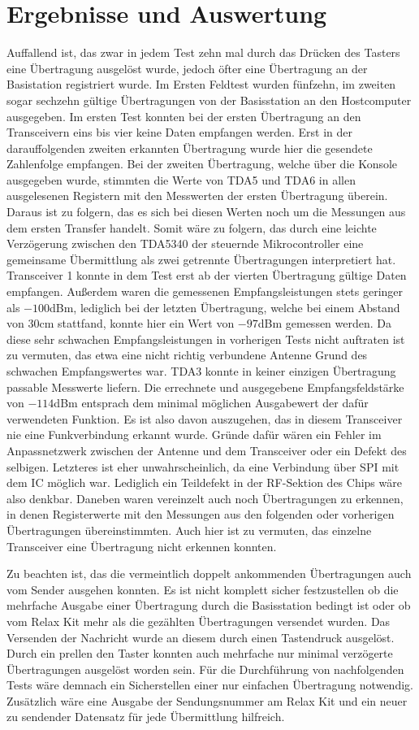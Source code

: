 \section{Ergebnisse und Auswertung}
Auffallend ist, das zwar in jedem Test zehn mal durch das Drücken des Tasters eine Übertragung ausgelöst wurde, jedoch öfter eine Übertragung an der Basistation registriert wurde. Im Ersten Feldtest wurden fünfzehn, im zweiten sogar sechzehn gültige Übertragungen von der Basisstation an den Hostcomputer ausgegeben. 
Im ersten Test konnten bei der ersten Übertragung an den Transceivern eins bis vier keine Daten empfangen  werden. Erst in der darauffolgenden zweiten erkannten Übertragung wurde hier die gesendete Zahlenfolge empfangen. Bei der zweiten Übertragung, welche über die Konsole ausgegeben wurde, stimmten die Werte von TDA5 und TDA6 in allen ausgelesenen Registern mit den Messwerten der ersten Übertragung überein.  Daraus ist zu folgern, das es sich bei diesen Werten noch um die Messungen aus dem ersten Transfer handelt. Somit wäre zu folgern, das durch eine leichte Verzögerung zwischen den TDA5340 der steuernde Mikrocontroller eine gemeinsame Übermittlung als zwei getrennte Übertragungen interpretiert hat.
Transceiver 1 konnte in dem Test erst ab der vierten Übertragung gültige Daten empfangen. Außerdem waren die gemessenen Empfangsleistungen stets geringer als $-100$dBm, lediglich  bei der letzten Übertragung, welche bei einem Abstand von $30$cm stattfand, konnte hier ein Wert von $-97$dBm gemessen werden. Da diese  sehr schwachen Empfangsleistungen in vorherigen Tests nicht auftraten ist zu vermuten, das etwa eine nicht richtig verbundene Antenne  Grund des schwachen Empfangswertes war.
TDA3 konnte in keiner einzigen Übertragung passable Messwerte liefern. Die errechnete und ausgegebene Empfangsfeldstärke von $-114$dBm entsprach dem minimal möglichen Ausgabewert der dafür verwendeten Funktion. Es ist also davon auszugehen, das in diesem Transceiver nie eine Funkverbindung erkannt wurde. Gründe dafür wären ein Fehler im Anpassnetzwerk zwischen der Antenne und dem Transceiver oder ein Defekt des selbigen. Letzteres ist eher unwahrscheinlich, da eine Verbindung über \ac{SPI} mit dem \ac{IC} möglich war. Lediglich ein Teildefekt  in der RF-Sektion des Chips wäre also denkbar.
Daneben waren vereinzelt auch noch Übertragungen zu erkennen, in denen Registerwerte mit den Messungen aus den folgenden oder vorherigen Übertragungen übereinstimmten. Auch hier ist zu vermuten, das einzelne Transceiver eine Übertragung nicht erkennen konnten. 


Zu beachten ist, das die vermeintlich doppelt ankommenden Übertragungen auch vom Sender ausgehen konnten. Es ist nicht komplett sicher festzustellen ob die mehrfache Ausgabe einer Übertragung durch die Basisstation  bedingt ist oder ob vom Relax Kit mehr als die gezählten Übertragungen versendet wurden. Das Versenden der Nachricht wurde an diesem durch einen Tastendruck ausgelöst.  Durch ein prellen den Taster konnten auch mehrfache nur minimal verzögerte Übertragungen ausgelöst worden sein.
Für die Durchführung von nachfolgenden Tests wäre demnach ein Sicherstellen einer nur einfachen Übertragung notwendig. Zusätzlich wäre eine Ausgabe der Sendungsnummer am Relax Kit und ein neuer zu sendender Datensatz für jede Übermittlung hilfreich.
